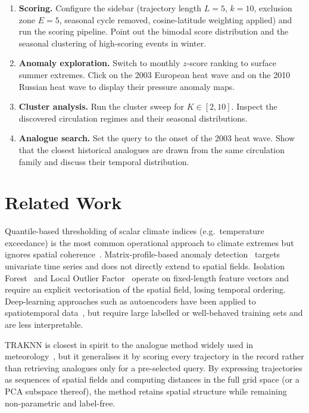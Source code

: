 \documentclass[runningheads]{llncs}
\begin{document}
\begin{enumerate}
  \item \textbf{Scoring.} Configure the sidebar (trajectory length $L=5$,
        $k=10$, exclusion zone $E=5$, seasonal cycle removed, cosine-latitude
        weighting applied) and run the scoring pipeline.
        Point out the bimodal score distribution and the seasonal clustering
        of high-scoring events in winter.
  \item \textbf{Anomaly exploration.} Switch to monthly $z$-score ranking to
        surface summer extremes.
        Click on the 2003 European heat wave and on the 2010 Russian heat wave
        to display their pressure anomaly maps.
  \item \textbf{Cluster analysis.} Run the cluster sweep for $K \in [2, 10]$.
        Inspect the discovered circulation regimes and their seasonal
        distributions.
  \item \textbf{Analogue search.} Set the query to the onset of the 2003 heat
        wave.
        Show that the closest historical analogues are drawn from the same
        circulation family and discuss their temporal distribution.
\end{enumerate}

\section{Related Work}
\label{sec:related}

Quantile-based thresholding of scalar climate indices (e.g.~temperature
exceedance) is the most common operational approach to climate extremes but
ignores spatial coherence~\cite{ipcc_wg1_2021}.
Matrix-profile-based anomaly detection~\cite{yeh2016matrix} targets
univariate time series and does not directly extend to spatial fields.
Isolation Forest~\cite{liu2008isolation} and Local Outlier
Factor~\cite{breunig2000lof} operate on fixed-length feature vectors and
require an explicit vectorisation of the spatial field, losing temporal
ordering.
Deep-learning approaches such as autoencoders have been applied to
spatiotemporal data~\cite{munir2019deepant}, but require large labelled or
well-behaved training sets and are less interpretable.

TRAKNN is closest in spirit to the analogue method widely used in
meteorology~\cite{van2018statistical,yiou2014anawege}, but it generalises it
by scoring every trajectory in the record rather than retrieving analogues only
for a pre-selected query.
By expressing trajectories as sequences of spatial fields and computing
distances in the full grid space (or a PCA subspace thereof), the method
retains spatial structure while remaining non-parametric and label-free.
\end{document}
